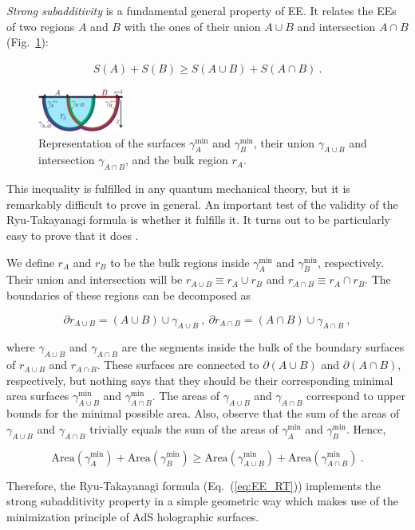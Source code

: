 \documentclass[twocolumn]{revtex4}
\providecommand{\eq}[2]{
    \begin{equation}
        #2
    \label{eq:#1}
    \end{equation}
}
\providecommand{\eqgat}[2]{
    \begin{gather}
        #2
    \label{eq:#1}
    \end{gather}
}
\begin{document}
\emph{Strong subadditivity}  is a fundamental general property of EE. It relates the EEs of two regions $A$ and $B$ with the ones of their union $A \cup B$ and intersection $A \cap B$ %
(Fig.~\ref{fig:SS}):
\eqgat{EE_strong-subadd}{
    S(A) + S(B) \ge S(A \cup B) + S(A \cap B) \ . %
}
\begin{figure}
    \centering
    \includegraphics[width=0.25\textwidth]{../imatges/SS_2-D.png}
\caption{Representation of the surfaces $\gamma_A^\text{min}$ and $\gamma_B^\text{min}$, their union $\gamma_{A \cup B}$ and intersection $\gamma_{A \cap B}$, and the bulk region $r_A$.}
\label{fig:SS}
\end{figure}
This inequality is fulfilled in any quantum mechanical theory, but it is remarkably difficult to prove in general. An important test of the validity of the Ryu-Takayanagi formula is whether it fulfills it. It turns out to be particularly easy to prove that it does \cite{headrick_holographic_2007}.

We define $r_A$ and $r_B$ to be the bulk regions inside $\gamma^{\text{min}}_A$ and $\gamma^{\text{min}}_B$, respectively. Their union and intersection will be $r_{A \cup B} \equiv  r_A \cup r_B$ and $r_{A \cap B} \equiv  r_A \cap r_B$. The boundaries of these regions can be decomposed as
\eq{SS_dr-1}{
    \partial r_{A \cup B} = (A \cup B) \cup \gamma_{A \cup B} \ , \ \partial r_{A \cap B } = (A \cap B) \cup \gamma_{A \cap B} \ , \nonumber
}
where $\gamma_{A \cup B}$ and $\gamma_{A \cap B}$ are the segments inside the bulk of the boundary surfaces of $r_{A \cup B}$ and $r_{A \cap B}$. These surfaces are connected to $\partial (A \cup B)$ and $\partial (A \cap B)$, respectively, but nothing says that they should be their corresponding minimal area surfaces $\gamma^{\text{min}}_{A \cup B}$ and $\gamma^{\text{min}}_{A \cap B}$. The areas of $\gamma_{A \cup B}$ and $\gamma_{A \cap B}$ correspond to upper bounds for the minimal possible area. Also, observe that the sum of the areas of $\gamma_{A \cup B}$ and $\gamma_{A \cap B}$ trivially equals the sum of the areas of $\gamma^{\text{min}}_A$ and $\gamma^{\text{min}}_B$. Hence,
\eq{SS_gamma-1}{
    {\text{Area}}(\gamma^{\text{min}}_A) + {\text{Area}}(\gamma^{\text{min}}_B) %
    \ge   {\text{Area}}(\gamma^{\text{min}}_{A \cup B}) +   {\text{Area}}(\gamma^{\text{min}}_{A \cap B}) \ . \nonumber
}
Therefore, the Ryu-Takayanagi formula (Eq.~(\ref{eq:EE_RT})) implements the strong subadditivity property in a simple geometric way which makes use of the minimization principle of AdS holographic surfaces. %
\end{document}
